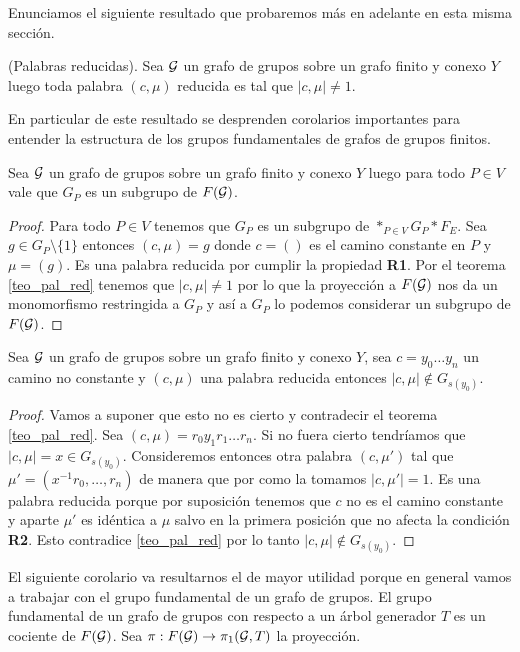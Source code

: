 \documentclass[tesis.tex]{subfiles}
\begin{document}
Enunciamos el siguiente resultado que probaremos más en adelante en esta misma sección.

\begin{teo}\label{teo_pal_red}(Palabras reducidas).
	Sea ${\cal G}$ un grafo de grupos sobre un grafo finito y conexo $Y$ luego toda palabra $(c, \mu)$ reducida es tal que $|c,\mu| \neq 1$.
\end{teo}

En particular de este resultado se desprenden corolarios importantes para entender la estructura de los grupos fundamentales de grafos de grupos finitos.

\begin{coro}\label{coro_pal_red_1}
	Sea ${\cal G}$ un grafo de grupos sobre un grafo finito y conexo $Y$ luego para todo $P \in V$ vale que $G_P$ es un subgrupo de $F({\cal G})$.
\end{coro}
\begin{proof}
	Para todo $P \in V$ tenemos que $G_P$ es un subgrupo de $\ast_{P \in V} G_P \ast F_E$.
	Sea  $g \in G_{P} \setminus \{ 1 \}$ entonces $(c, \mu) = g$ donde $c = ()$ es el camino constante en $P$ y $\mu = (g)$.
	Es una palabra reducida por cumplir la propiedad \textbf{R1}.
	Por el teorema \ref{teo_pal_red} tenemos que $|c,\mu| \neq 1$ por lo que  la proyección a $F({\cal G})$ nos da un monomorfismo restringida a $G_P$ y así a $G_P$ lo podemos considerar un subgrupo de $F({\cal G})$.
\end{proof}

\begin{coro}\label{coro_pal_red_2}
	Sea ${\cal G}$ un grafo de grupos sobre un grafo finito y conexo $Y$, sea $c = y_0 \dots y_n$ un camino no constante y $(c, \mu)$ una palabra reducida entonces $|c, \mu| \notin G_{s(y_0)}$.
\end{coro}
\begin{proof}
	Vamos a suponer que esto no es cierto y contradecir el teorema \ref{teo_pal_red}.
	Sea $(c, \mu) = r_0y_1r_1\dots r_n$.
	Si no fuera cierto tendríamos que $|c,\mu| = x \in G_{s(y_0)}$. 
	Consideremos entonces otra palabra $(c,\mu')$ tal que $\mu' = (x^{-1}r_0, \dots, r_n)$ de manera que por como la tomamos $|c,\mu'| = 1$.
	Es una palabra reducida porque por suposición tenemos que $c$ no es el camino constante y aparte $\mu'$ es idéntica a $\mu$ salvo en la primera posición que no afecta la condición \textbf{R2}.
	Esto contradice \ref{teo_pal_red} por lo tanto $|c, \mu| \notin G_{s(y_0)}$.
\end{proof}

El siguiente corolario va resultarnos el de mayor utilidad porque en general vamos a trabajar con el grupo fundamental de un grafo de grupos.
El grupo fundamental de un grafo de grupos con respecto a un árbol generador $T$ es un cociente de $F({\cal G})$. 
Sea $\pi: F({\cal G}) \to \pi_1({\cal G},T)$ la proyección.
\end{document}
